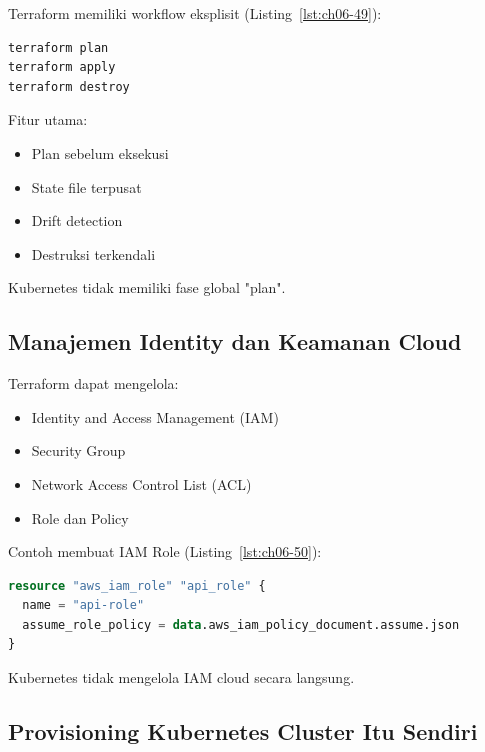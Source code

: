 Terraform memiliki workflow eksplisit (Listing~\ref{lst:ch06-49}):

\begin{lstlisting}[language=bash, caption={Memeriksa rencana perubahan Terraform}, label={lst:ch06-49}]
terraform plan
terraform apply
terraform destroy
\end{lstlisting}

Fitur utama:

\begin{itemize}
    \item Plan sebelum eksekusi
    \item State file terpusat
    \item Drift detection
    \item Destruksi terkendali
\end{itemize}

Kubernetes tidak memiliki fase global "plan".

\subsection{Manajemen Identity dan Keamanan Cloud}

Terraform dapat mengelola:

\begin{itemize}
    \item Identity and Access Management (IAM)
    \item Security Group
    \item Network Access Control List (ACL)
    \item Role dan Policy
\end{itemize}

Contoh membuat IAM Role (Listing~\ref{lst:ch06-50}):

\begin{lstlisting}[language=terraform, caption={Potongan kode Terraform pada Manajemen Identity dan Keamanan Cloud}, label={lst:ch06-50}]
resource "aws_iam_role" "api_role" {
  name = "api-role"
  assume_role_policy = data.aws_iam_policy_document.assume.json
}
\end{lstlisting}

Kubernetes tidak mengelola IAM cloud secara langsung.

\subsection{Provisioning Kubernetes Cluster Itu Sendiri}

